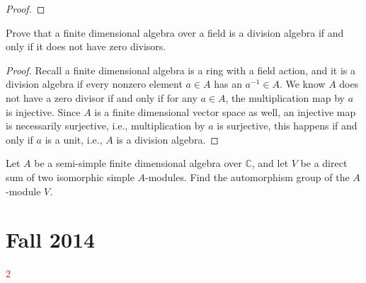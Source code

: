 \documentclass[openany]{book}
\begin{document}
\begin{proof}
    




\end{proof}

\begin{prob}
    Prove that a finite dimensional algebra over a field is a division algebra if and only if it does not have zero divisors.
\end{prob}
\begin{proof}
    Recall a finite dimensional algebra is a ring with a field action, and it is a division algebra if every nonzero element $a\in A$ has an $a^{-1}\in A$. We know $A$ does not have a zero divisor if and only if for any $a\in A$, the multiplication map by $a$ is injective. Since $A$ is a finite dimensional vector space as well, an injective map is necessarily surjective, i.e., multiplication by $a$ is surjective, this happens if and only if $a$ is a unit, i.e., $A$ is a division algebra.
\end{proof}


\begin{prob}
    Let \(A\) be a semi-simple finite dimensional algebra over \(\mathbb{C}\), and let \(V\) be a direct sum of two isomorphic simple \(A\)-modules. Find the automorphism group of the \(A\)-module \(V\).
\end{prob}

\chapter{Fall 2014}


\textcolor{red}{2}
\end{document}
